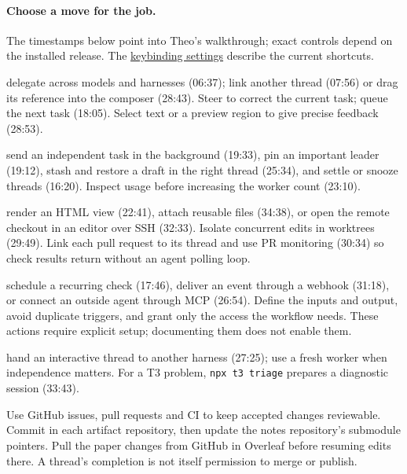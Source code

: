\paragraph{Choose a move for the job.} The timestamps below point into Theo's walkthrough; exact controls depend on the installed release. The \href{https://github.com/pingdotgg/t3code/blob/main/docs/user/keybindings.md}{keybinding settings} describe the current shortcuts.
\begin{description}[noitemsep]
  \item[Direct the work:] delegate across models and harnesses (06:37); link another thread (07:56) or drag its reference into the composer (28:43). Steer to correct the current task; queue the next task (18:05). Select text or a preview region to give precise feedback (28:53).
  \item[Manage attention:] send an independent task in the background (19:33), pin an important leader (19:12), stash and restore a draft in the right thread (25:34), and settle or snooze threads (16:20). Inspect usage before increasing the worker count (23:10).
  \item[Inspect and deliver:] render an HTML view (22:41), attach reusable files (34:38), or open the remote checkout in an editor over SSH (32:33). Isolate concurrent edits in worktrees (29:49). Link each pull request to its thread and use PR monitoring (30:34) so check results return without an agent polling loop.
  \item[Trigger bounded work:] schedule a recurring check (17:46), deliver an event through a webhook (31:18), or connect an outside agent through MCP (26:54). Define the inputs and output, avoid duplicate triggers, and grant only the access the workflow needs. These actions require explicit setup; documenting them does not enable them.
  \item[Change perspective or diagnose:] hand an interactive thread to another harness (27:25); use a fresh worker when independence matters. For a T3 problem, \texttt{npx t3 triage} prepares a diagnostic session (33:43).
\end{description}
Use GitHub issues, pull requests and CI to keep accepted changes reviewable. Commit in each artifact repository, then update the notes repository's submodule pointers. Pull the paper changes from GitHub in Overleaf before resuming edits there. A thread's completion is not itself permission to merge or publish.
